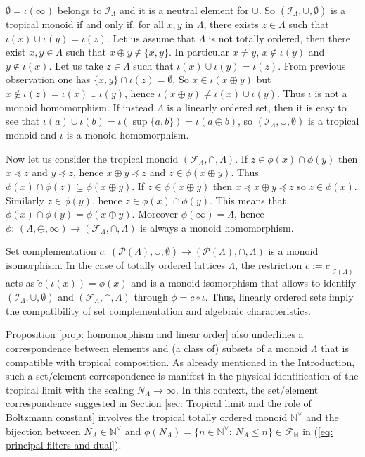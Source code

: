 \documentclass[11pt,british,reqno]{article}
\makeatletter
\numberwithin{equation}{section}
\numberwithin{figure}{section}
\numberwithin{table}{section}
\theoremstyle{definition}
\theoremstyle{definition}
\theoremstyle{plain}
\theoremstyle{plain}
\theoremstyle{remark}
\theoremstyle{plain}
\numberwithin{equation}{section}
\numberwithin{figure}{section}
\numberwithin{table}{section}
\theoremstyle{plain}
\renewenvironment{proof}[1][\proofname]{\par
  \pushQED{\qed}%
  \normalfont \topsep6\p@\@plus6\p@\relax
  \list{}{%
    \settowidth{\leftmargin}{\itshape\proofname:\hskip\labelsep}%
    \setlength{\labelwidth}{0pt}%
    \setlength{\itemindent}{-\leftmargin}%
  }%
  \item[\hskip\labelsep\itshape#1\@addpunct{:}]\ignorespaces
}{%
  \popQED\endlist\@endpefalse
}
\makeatother
\begin{document}
\begin{proof} $\emptyset=\iota(\infty)$ belongs to $\mathcal{I}_{\Lambda}$ and
it is a neutral element for $\cup$. So $(\mathcal{I}_{\Lambda},\cup,\emptyset)$
is a tropical monoid if and only if, for all $x,y$ in $\Lambda$,
there exists $z\in\Lambda$ such that $\iota(x)\cup\iota(y)=\iota(z)$.
Let us assume that $\Lambda$ is not totally ordered, then there exist
$x,y\in\Lambda$ such that $x\oplus y\notin\{x,y\}$. In particular
$x\neq y$, $x\notin\iota(y)$ and $y\notin\iota(x)$. Let us take
$z\in\Lambda$ such that $\iota(x)\cup\iota(y)=\iota(z)$. From previous
observation one has $\{x,y\}\cap\iota(z)=\emptyset$. So $x\in\iota(x\oplus y)$
but $x\notin\iota(z)=\iota(x)\cup\iota(y)$, hence $\iota(x\oplus y)\neq\iota(x)\cup\iota(y)$.
Thus $\iota$ is not a monoid homomorphism. If instead $\Lambda$
is a linearly ordered set, then it is easy to see that $\iota(a)\cup\iota(b)=\iota(\sup\{a,b\})=\iota(a\oplus b)$,
so $(\mathcal{I}_{\Lambda},\cup,\emptyset)$ is a tropical monoid
and $\iota$ is a monoid homomorphism. 

Now let us consider the tropical monoid $(\mathcal{F}_{\Lambda},\cap,\Lambda)$.
If $z\in\phi(x)\cap\phi(y)$ then $x\preceq z$ and $y\preceq z$,
hence $x\oplus y\preceq z$ and $z\in\phi(x\oplus y)$. Thus $\phi(x)\cap\phi(z)\subseteq\phi(x\oplus y)$.
If $z\in\phi(x\oplus y)$ then $x\preceq x\oplus y\preceq z$ so $z\in\phi(x)$.
Similarly $z\in\phi(y)$, hence $z\in\phi(x)\cap\phi(y)$. This means
that $\phi(x)\cap\phi(y)=\phi(x\oplus y)$. Moreover $\phi(\infty)=\Lambda$,
hence $\phi:\,(\Lambda,\oplus,\infty)\longrightarrow(\mathcal{F}_{\Lambda},\cap,\Lambda)$
is always a monoid homomorphism.  
\end{proof}

Set complementation $c:\,(\mathcal{P}(\Lambda),\cup,\emptyset)\longrightarrow(\mathcal{P}(\Lambda),\cap,\Lambda)$
is a monoid isomorphism. In the case of totally ordered lattices $\Lambda$,
the restriction $\tilde{c}:=c|_{\mathcal{I}(\Lambda)}$ acts as $\tilde{c}(\iota(x))=\phi(x)$
and is a monoid isomorphism that allows to identify $(\mathcal{I}_{\Lambda},\cup,\emptyset)$
and $(\mathcal{F}_{\Lambda},\cap,\Lambda)$ through $\phi=\tilde{c}\circ\iota$.
Thus, linearly ordered sets imply the compatibility of set complementation and algebraic characteristics. 

Proposition \ref{prop: homomorphism and linear order} also underlines a correspondence between elements and (a class of) subsets of a monoid $\Lambda$ that is compatible with tropical composition. As already mentioned in the Introduction, such a set/element correspondence is manifest in the physical identification of the tropical
limit with the scaling $N_{A}\rightarrow\infty$. In this context,
the set/element correspondence suggested in Section \ref{sec: Tropical limit and the role of Boltzmann constant} involves the tropical totally ordered
monoid $\mathbb{N}^{\vee}$ and the bijection between $N_{A}\in\mathbb{N}^{\vee}$
and $\phi(N_{A})=\{n\in\mathbb{N}^{\vee}:\,N_{A}\leq n\}\in\mathcal{F}_{\mathbb{N}}$ in (\ref{eq: principal filters and dual}). 
\end{document}

